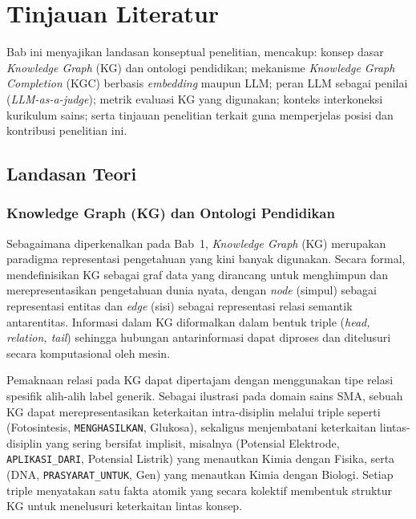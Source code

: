 \documentclass[main]{subfiles}
\begin{document}
\ifSubfilesClassLoaded{}{\setcounter{chapter}{1}}

\chapter{Tinjauan Literatur}

Bab ini menyajikan landasan konseptual penelitian, mencakup: konsep
dasar \textit{Knowledge Graph} (KG) dan ontologi pendidikan; mekanisme
\textit{Knowledge Graph Completion} (KGC) berbasis \textit{embedding}
maupun LLM; peran LLM sebagai penilai (\textit{LLM-as-a-judge}); metrik
evaluasi KG yang digunakan; konteks interkoneksi kurikulum sains; serta
tinjauan penelitian terkait guna memperjelas posisi dan kontribusi
penelitian ini.

\section{Landasan Teori}

\subsection{Knowledge Graph (KG) dan Ontologi Pendidikan}
\label{subsec:kg-ontologi}

Sebagaimana diperkenalkan pada Bab~1, \textit{Knowledge Graph} (KG) merupakan
paradigma representasi pengetahuan yang kini banyak digunakan. Secara formal,
\textcite{hogan_knowledge_2022} mendefinisikan KG sebagai graf data yang
dirancang untuk menghimpun dan merepresentasikan pengetahuan dunia nyata, dengan
\textit{node} (simpul) sebagai representasi entitas dan \textit{edge} (sisi)
sebagai representasi relasi semantik antarentitas. Informasi dalam KG
diformalkan dalam bentuk triple (\textit{head, relation, tail}) sehingga
hubungan antarinformasi dapat diproses dan ditelusuri secara komputasional oleh
mesin.

Pemaknaan relasi pada KG dapat dipertajam dengan menggunakan tipe relasi
spesifik alih-alih label generik. Sebagai ilustrasi pada domain sains SMA,
sebuah KG dapat merepresentasikan keterkaitan intra-disiplin melalui triple
seperti (Fotosintesis, \texttt{MENGHASILKAN}, Glukosa), sekaligus menjembatani
keterkaitan lintas-disiplin yang sering bersifat implisit, misalnya
(Potensial Elektrode, \texttt{APLIKASI\_DARI}, Potensial Listrik) yang menautkan
Kimia dengan Fisika, serta (DNA, \texttt{PRASYARAT\_UNTUK}, Gen) yang menautkan
Kimia dengan Biologi. Setiap triple menyatakan satu fakta atomik yang secara
kolektif membentuk struktur KG untuk menelusuri keterkaitan lintas konsep.
\end{document}
